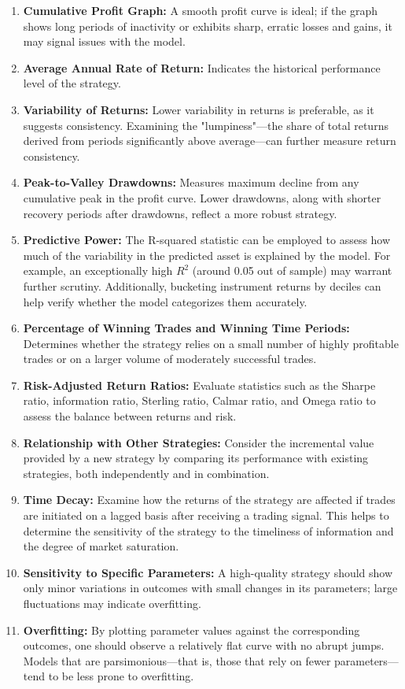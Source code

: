 \begin{remark} 
\begin{enumerate}[label=\roman*.]
\setlength{\itemsep}{0pt}
\item \textbf{Cumulative Profit Graph:} A smooth profit curve is ideal; if the graph shows long periods of inactivity or exhibits sharp, erratic losses and gains, it may signal issues with the model.
\item \textbf{Average Annual Rate of Return:} Indicates the historical performance level of the strategy.
\item \textbf{Variability of Returns:} Lower variability in returns is preferable, as it suggests consistency. Examining the "lumpiness"—the share of total returns derived from periods significantly above average—can further measure return consistency.
\item \textbf{Peak-to-Valley Drawdowns:} Measures maximum decline from any cumulative peak in the profit curve. Lower drawdowns, along with shorter recovery periods after drawdowns, reflect a more robust strategy.
\item \textbf{Predictive Power:} The R-squared statistic can be employed to assess how much of the variability in the predicted asset is explained by the model. For example, an exceptionally high \( R^2 \) (around 0.05 out of sample) may warrant further scrutiny. Additionally, bucketing instrument returns by deciles can help verify whether the model categorizes them accurately.
\item \textbf{Percentage of Winning Trades and Winning Time Periods:} Determines whether the strategy relies on a small number of highly profitable trades or on a larger volume of moderately successful trades.
\item \textbf{Risk-Adjusted Return Ratios:} Evaluate statistics such as the Sharpe ratio, information ratio, Sterling ratio, Calmar ratio, and Omega ratio to assess the balance between returns and risk.
\item \textbf{Relationship with Other Strategies:} Consider the incremental value provided by a new strategy by comparing its performance with existing strategies, both independently and in combination.
\item \textbf{Time Decay:} Examine how the returns of the strategy are affected if trades are initiated on a lagged basis after receiving a trading signal. This helps to determine the sensitivity of the strategy to the timeliness of information and the degree of market saturation.
\item \textbf{Sensitivity to Specific Parameters:} A high-quality strategy should show only minor variations in outcomes with small changes in its parameters; large fluctuations may indicate overfitting.
\item \textbf{Overfitting:} By plotting parameter values against the corresponding outcomes, one should observe a relatively flat curve with no abrupt jumps. Models that are parsimonious—that is, those that rely on fewer parameters—tend to be less prone to overfitting.
\end{enumerate}
\end{remark}


